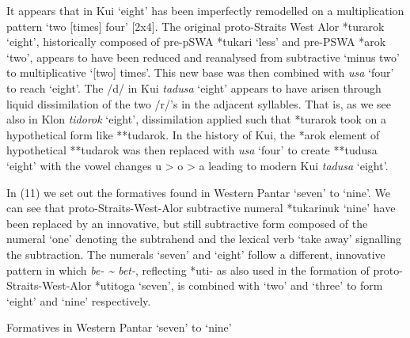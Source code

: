 It appears that in Kui {\textquoteleft}eight{\textquoteright} has been imperfectly remodelled on a multiplication pattern {\textquoteleft}two [times] four{\textquoteright} [2x4]. The original proto-Straits West Alor *turarok {\textquoteleft}eight{\textquoteright}, historically composed of pre-pSWA *tukari {\textquoteleft}less{\textquoteright} and pre-PSWA *arok {\textquoteleft}two{\textquoteright}, appears to have been reduced and reanalysed from subtractive {\textquoteleft}minus two{\textquoteright} to multiplicative {\textquoteleft}[two] times{\textquoteright}. This new base was then combined with \textit{usa }{\textquoteleft}four{\textquoteright} to reach {\textquoteleft}eight{\textquoteright}. The /d/ in Kui \textit{tadusa} {\textquoteleft}eight{\textquoteright} appears to have arisen through liquid dissimilation of the two /r/{\textquoteright}s in the adjacent syllables. That is, as we see also in Klon \textit{tidorok} {\textquoteleft}eight{\textquoteright}, dissimilation applied such that *turarok took 
on a hypothetical form like **tudarok. In the history of Kui, the *arok element of hypothetical **tudarok was then replaced with \textit{usa} {\textquoteleft}four{\textquoteright} to create **tudusa {\textquoteleft}eight{\textquoteright} with the vowel changes u {\textgreater} o {\textgreater} a leading to modern Kui \textit{tadusa} {\textquoteleft}eight{\textquoteright}.

In (11) we set out the formatives found in Western Pantar {\textquoteleft}seven{\textquoteright} to {\textquoteleft}nine{\textquoteright}. We can see that proto-Straits-West-Alor subtractive numeral *tukarinuk {\textquoteleft}nine{\textquoteright} have been replaced by an innovative, but still subtractive form composed of the numeral {\textquoteleft}one{\textquoteright} denoting the subtrahend and the lexical verb {\textquoteleft}take away{\textquoteright} signalling the subtraction. The numerals {\textquoteleft}seven{\textquoteright} and {\textquoteleft}eight{\textquoteright} follow a different, innovative pattern in which \textit{be- \~{} bet-}, reflecting *{\texthtb}uti- as also used in the formation of proto-Straits-West-Alor *{\texthtb}utitoga {\textquoteleft}seven{\textquoteright}, is combined with {\textquoteleft}two{\textquoteright} and {\textquoteleft}three{\textquoteright} to form {\textquoteleft}eight{\textquoteright} and {\textquoteleft}nine{\textquoteright} respectively. 

Formatives in Western Pantar {\textquoteleft}seven{\textquoteright} to {\textquoteleft}nine{\textquoteright}

